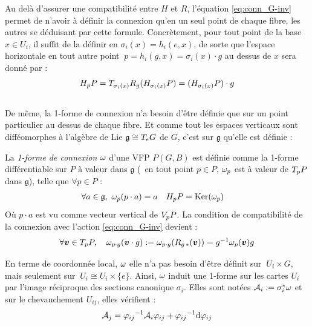 Au delà d'assurer une compatibilité entre $H$ et $R$, l'équation \eqref{eq:conn_G-inv} permet de n'avoir à définir la connexion qu'en un seul point de chaque fibre, les autres se déduisant par cette formule. 
Concrètement, pour tout point de la base $x\in U_i$, il suffit de la définir en $\sigma_i(x) = h_i(e, x)$, de sorte que l'espace horizontale en tout autre point $\ p=h_i(g, x) = \sigma_i(x)\cdot g$ au dessus de $x$ sera donné par :
\[\hg[p]{P} = \tg[\sigma_i(x)]{R_g} (\hg[\sigma_i(x)]{P}) =  (\hg[\sigma_i(x)]{P}) \cdot g\]
\\
De même, la 1-forme de connexion n'a besoin d'être définie que sur un point particulier au dessus de chaque fibre. Et comme tout les espaces verticaux sont difféomorphes à l'algèbre de Lie $\mathfrak{g}\cong \tg[e]{G}$ de $G$, c'est sur $\mathfrak{g}$ qu'elle est définie :

\begin{definition} \label{def:1-form2conn}
	La \emph{1-forme de connexion} $\conn$ d'une VFP $P(G,B)$ est définie comme la 1-forme différentiable sur $P$ à valeur dans $\mathfrak{g}$ (\ie~en tout point $p\in P$, $\conn_p$ est à valeur de $\tg[p]{P}$ dans $\mathfrak{g}$), telle que $\forall p\in P$ :
	\begin{align} \label{eq:1-form2conn}
		\forall a\in \mathfrak{g},\ \conn_p(p\cdot a) &= a  &  \hg[p]{P} &= \Ker(\conn_p)
	\end{align}
	Où $p\cdot a$ est vu comme vecteur vertical de $\vg[p]{P}$. La condition de compatibilité de la connexion avec l'action \eqref{eq:conn_G-inv} devient :
	\begin{equation} \label{eq:1-form_G-inv}
		\forall \bf{v}\in\tg[p]{P},\quad \conn_{p\cdot g}(\bf{v}\cdot g) \defeq \conn_{p\cdot g}(R_{g\, *}(\bf{v})) = g^{-1}\conn_p(\bf{v})g
	\end{equation}
	\skipl
	
	En terme de coordonnée local, $\conn$ elle n'a pas besoin d'être définit sur $\ U_i\times G$, mais seulement sur $\ U_i \cong U_i \times \{e\}$. Ainsi, $\conn$ induit une 1-forme sur les cartes $U_i$ par l'image réciproque des sections canonique $\sigma_i$. Elles sont notées $\locconn_i \defeq \sigma_i^*\conn$ et sur le chevauchement $U_{ij}$, elles vérifient :
	\begin{equation}\label{eq:conn_local}
		\locconn_j = {\varphi_{ij}}^{-1} \locconn_i \varphi_{ij} + {\varphi_{ij}}^{-1} \d \varphi_{ij}
	\end{equation}
\end{definition}
\skipl


